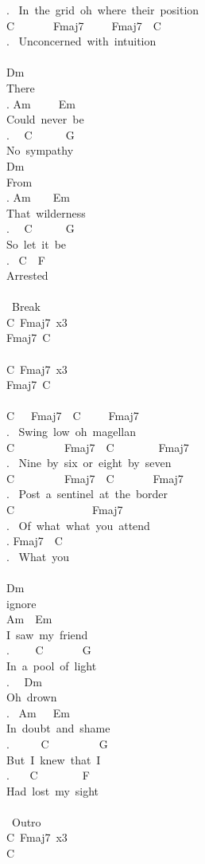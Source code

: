 {. \ In\ the\ grid\ oh\ where\ their\ position\\
C\ \ \ \ \ \ \ Fmaj7\ \ \ \ \ Fmaj7\ \ C\\
. \ Unconcerned\ with\ intuition\\
\\
Dm\\
There\\
. Am\ \ \ \ \ Em\\
Could\ never\ be\\
. \ \ C\ \ \ \ \ \ G\\
No\ sympathy\\
Dm\\
From\\
. Am\ \ \ \ Em\\
That\ wilderness\\
. \ \ C\ \ \ \ \ \ G\\
So\ let\ it\ be\\
. \ C\ \ F\\
Arrested\\
\\
\lbrack\ Break\rbrack\\
C\ Fmaj7\ x3\ \\
Fmaj7\ C\\
\\
C\ Fmaj7\ x3\ \\
Fmaj7\ C\\
\\
C\ \ \ Fmaj7\ \ C\ \ \ \ \ Fmaj7\\
. \ Swing\ low\ oh\ magellan\\
C\ \ \ \ \ \ \ \ \ Fmaj7\ \ C\ \ \ \ \ \ \ \ Fmaj7\\
. \ Nine\ by\ six\ or\ eight\ by\ seven\\
C\ \ \ \ \ \ \ \ \ Fmaj7\ \ C\ \ \ \ \ \ \ Fmaj7\ \\
. \ Post\ a\ sentinel\ at\ the\ border\\
C\ \ \ \ \ \ \ \ \ \ \ \ \ \ Fmaj7\\
. \ Of\ what\ what\ you\ attend\\
. Fmaj7\ \ C\ \ \ \\
. \ What\ you\\
\\
Dm\\
ignore\\
Am\ \ Em\\
I\ saw\ my\ friend\\
. \ \ \ \ C\ \ \ \ \ \ \ G\\
In\ a\ pool\ of\ light\\
. \ \ Dm\\
Oh\ drown\\
. \ Am\ \ \ Em\\
In\ doubt\ and\ shame\\
. \ \ \ \ \ C\ \ \ \ \ \ \ \ \ G\\
But\ I\ knew\ that\ I\\
. \ \ \ C\ \ \ \ \ \ \ \ F\\
Had\ lost\ my\ sight\\
\\
\lbrack\ Outro\rbrack\\
C\ Fmaj7\ x3\ \\
C\ }
